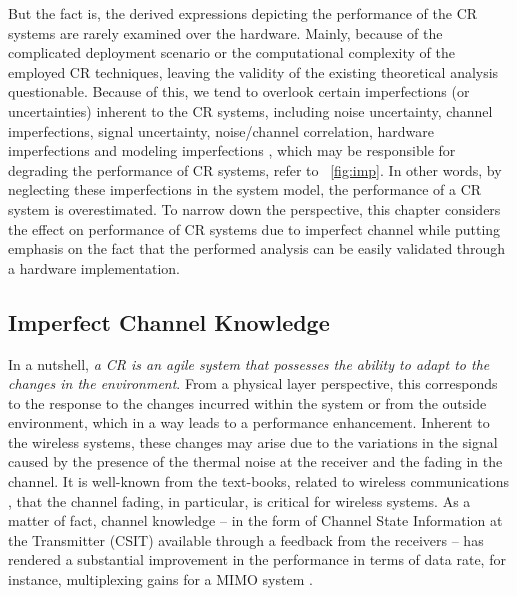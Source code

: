 But the fact is, the derived expressions depicting the performance of the CR systems are rarely examined over the hardware. Mainly, because of the complicated deployment scenario or the computational complexity of the employed CR techniques, leaving the validity of the existing theoretical analysis questionable. Because of this, we tend to overlook certain imperfections (or uncertainties) inherent to the CR systems, including noise uncertainty, channel imperfections, signal uncertainty, noise/channel correlation, hardware imperfections and modeling imperfections \cite{Sharma15}, which may be responsible for degrading the performance of CR systems, refer to \figurename~\ref{fig:imp}. In other words, by neglecting these imperfections in the system model, the performance of a CR system is overestimated. To narrow down the perspective, this chapter considers the effect on performance of CR systems due to imperfect channel while putting emphasis on the fact that the performed analysis can be easily validated through a hardware implementation.


\subsection{Imperfect Channel Knowledge}
\label{ssec:ICK}
In a nutshell, \textit{a CR is an agile system that possesses the ability to adapt to the changes in the environment}. From a physical layer perspective, this corresponds to the response to the changes incurred within the system or from the outside environment, which in a way leads to a performance enhancement. Inherent to the wireless systems, these changes may arise due to the variations in the signal caused by the presence of the thermal noise at the receiver and the fading in the channel. It is well-known from the text-books, related to wireless communications \cite{Goldsmith05, Tse05}, that the channel fading, in particular, is critical for wireless systems. As a matter of fact, channel knowledge -- in the form of Channel State Information at the Transmitter (CSIT) available through a feedback from the receivers -- has rendered a substantial improvement in the performance in terms of data rate, for instance, multiplexing gains for a MIMO system \cite{Ali12}.




